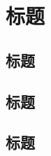 \chapter{\textbf{标题}}%
\section[\textnormal{标题}]{\textbf{标题}}

\section[\textnormal{标题}]{\textbf{标题}}


\section[\textnormal{标题}]{\textbf{标题}}






















